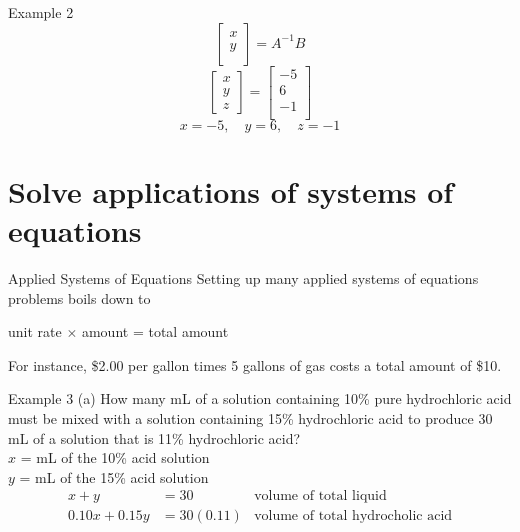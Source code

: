 \documentclass[t]{beamer}
\begin{document}
\begin{frame}{Example 2}
\[
\begin{bmatrix}
x \\ y \\
\end{bmatrix}
= A^{-1}B
\]
\pause \vspace{6pt}
\[
\begin{bmatrix}
x \\ y \\ z
\end{bmatrix}
= \begin{bmatrix}
-5 \\ 6 \\ -1 \\
\end{bmatrix}
\]
\pause \vspace{6pt}
\[x = -5, \quad y = 6, \quad z = -1\]
\end{frame}


\section{Solve applications of systems of equations}

\begin{frame}{Applied Systems of Equations}
Setting up many applied systems of equations problems boils down to 
\begin{center}
unit rate $\times$ amount = total amount
\end{center}
For instance, \$2.00 per gallon times 5 gallons of gas costs a total amount of \$10.
\end{frame}

\begin{frame}{Example 3}
(a) \quad How many mL of a solution containing 10\% pure hydrochloric acid must be mixed with a solution containing 15\% hydrochloric acid to produce 30 mL of a solution that is 11\% hydrochloric acid?	\pause	\newline\\
$x$ = mL of the 10\% acid solution \\
$y$ = mL of the 15\% acid solution \pause
\begin{align*}
x + y &= 30 &\text{volume of total liquid} \\
0.10x + 0.15y &= 30(0.11) &\text{volume of total hydrocholic acid} \\
\end{align*}	
\end{frame}
\end{document}
